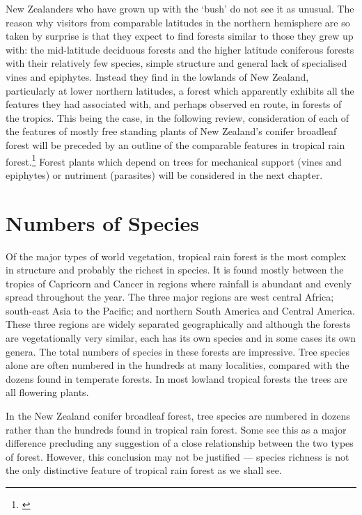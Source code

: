 New Zealanders who have grown up with the `bush' do not see it as unusual.
The reason why visitors from comparable latitudes in the northern hemisphere are so taken by surprise is that they expect to find forests similar to those they grew up with: the mid-latitude deciduous forests and the higher latitude coniferous forests with their relatively few species, simple structure and general lack of specialised vines and epiphytes.
Instead they find in the lowlands of New Zealand, particularly at lower northern latitudes, a forest which apparently exhibits all the features they had associated with, and perhaps observed en route, in forests of the tropics.
This being the case, in the following review, consideration of each of the features of mostly free standing plants of New Zealand's conifer broadleaf forest will be preceded by an outline of the comparable features in tropical rain forest.\footnote{\cite{richards1952tropical}}
Forest plants which depend on trees for mechanical support (vines and epiphytes) or nutriment (parasites) will be considered in the next chapter.

\section{Numbers of Species}

Of the major types of world vegetation, tropical rain forest is the most complex in structure and probably the richest in species.
It is found mostly between the tropics of Capricorn and Cancer in regions where rainfall is abundant and evenly spread throughout the year.
The three major regions are west central Africa; south-east Asia to the Pacific; and northern South America and Central America.
These three regions are widely separated geographically and although the forests are vegetationally very similar, each has its own species and in some cases its own genera.
The total numbers of species in these forests are impressive.
Tree species alone are often numbered in the hundreds at many localities, compared with the dozens found in temperate forests.
In most lowland tropical forests the trees are all flowering plants.

In the New Zealand conifer broadleaf forest, tree species are numbered in dozens rather than the hundreds found in tropical rain forest.
Some see this as a major difference precluding any suggestion of a close relationship between the two types of forest.
However, this conclusion may not be justified --- species richness is not the only distinctive feature of tropical rain forest as we shall see.

